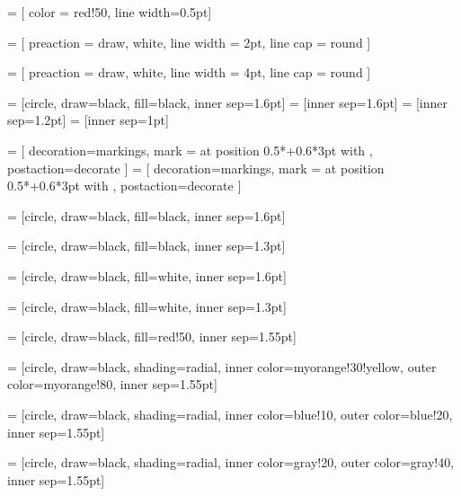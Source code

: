 \usepackage{xcolor,tikz}

\usetikzlibrary{decorations.pathmorphing, decorations.markings, arrows, arrows.meta, shapes, patterns}




 = [ color = red!50, line width=0.5pt]

 = [ preaction = { draw, white, line width = 2pt,  line cap = round } ]

 = [ preaction = { draw, white, line width = 4pt,  line cap = round } ]



 = [circle, draw=black, fill=black, inner sep=1.6pt]
 = [inner sep=1.6pt]
 = [inner sep=1.2pt]
 = [inner sep=1pt]

\tikzstyle{->-} = [ decoration={markings, mark = at position 0.5*\pgfdecoratedpathlength+0.6*3pt with \arrow{>[line width=0.4pt,length=3pt,width=3.5pt]} }, postaction={decorate} ]
\tikzstyle{-<-} = [ decoration={markings, mark = at position 0.5*\pgfdecoratedpathlength+0.6*3pt with \arrow{<[line width=0.4pt,length=3pt,width=3.5pt]} }, postaction={decorate} ]





 = [circle, draw=black, fill=black, inner sep=1.6pt]

 = [circle, draw=black, fill=black, inner sep=1.3pt]

 = [circle, draw=black, fill=white, inner sep=1.6pt]

 = [circle, draw=black, fill=white, inner sep=1.3pt]

 = [circle, draw=black, fill=red!50, inner sep=1.55pt]

 = [circle, draw=black, shading=radial, inner color=myorange!30!yellow, outer color=myorange!80, inner sep=1.55pt]

 = [circle, draw=black, shading=radial, inner color=blue!10, outer color=blue!20, inner sep=1.55pt]

 = [circle, draw=black, shading=radial, inner color=gray!20, outer color=gray!40, inner sep=1.55pt]

